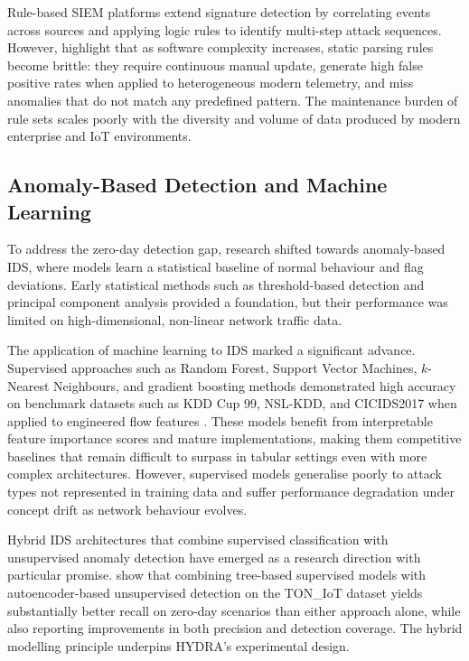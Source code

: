 \documentclass[12pt,a4paper]{report}
\begin{document}
Rule-based SIEM platforms extend signature detection by correlating events across sources and applying logic rules to identify multi-step attack sequences. However, \citet{zhu2023} highlight that as software complexity increases, static parsing rules become brittle: they require continuous manual update, generate high false positive rates when applied to heterogeneous modern telemetry, and miss anomalies that do not match any predefined pattern. The maintenance burden of rule sets scales poorly with the diversity and volume of data produced by modern enterprise and IoT environments.

\subsection{Anomaly-Based Detection and Machine Learning}
\label{sec:anomaly}

To address the zero-day detection gap, research shifted towards anomaly-based IDS, where models learn a statistical baseline of normal behaviour and flag deviations. Early statistical methods such as threshold-based detection and principal component analysis provided a foundation, but their performance was limited on high-dimensional, non-linear network traffic data.

The application of machine learning to IDS marked a significant advance. Supervised approaches such as Random Forest, Support Vector Machines, $k$-Nearest Neighbours, and gradient boosting methods demonstrated high accuracy on benchmark datasets such as KDD Cup 99, NSL-KDD, and CICIDS2017 when applied to engineered flow features \citep{aldweesh2020}. These models benefit from interpretable feature importance scores and mature implementations, making them competitive baselines that remain difficult to surpass in tabular settings even with more complex architectures. However, supervised models generalise poorly to attack types not represented in training data and suffer performance degradation under concept drift as network behaviour evolves.

Hybrid IDS architectures that combine supervised classification with unsupervised anomaly detection have emerged as a research direction with particular promise. \citet{alsaedi2020} show that combining tree-based supervised models with autoencoder-based unsupervised detection on the TON\_IoT dataset yields substantially better recall on zero-day scenarios than either approach alone, while also reporting improvements in both precision and detection coverage. The hybrid modelling principle underpins HYDRA's experimental design.
\end{document}
